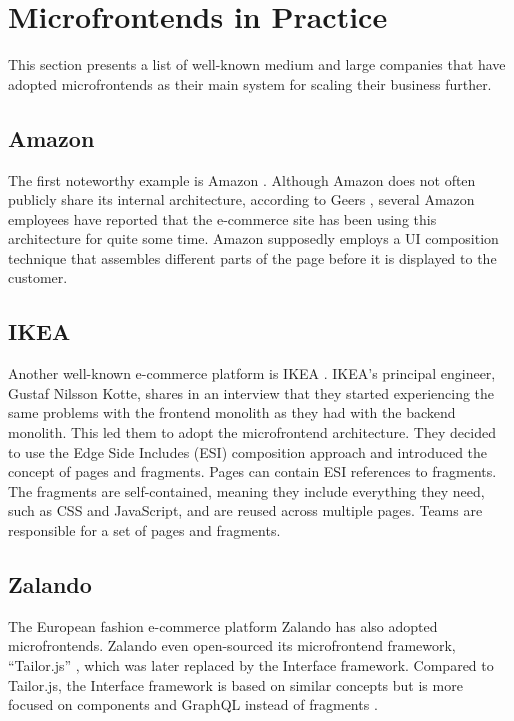 \section{Microfrontends in Practice}
This section presents a list of well-known medium and large companies that have adopted microfrontends as their main system for scaling their business further. \\

\subsection{Amazon}
The first noteworthy example is Amazon \cite{Amazon}. Although Amazon does not often publicly share its internal architecture, according to Geers \cite{Geers}, several Amazon employees have reported that the e-commerce site has been using this architecture for quite some time. Amazon supposedly employs a UI composition technique that assembles different parts of the page before it is displayed to the customer. \\

\subsection{IKEA}
Another well-known e-commerce platform is IKEA \cite{IKEA}. IKEA's principal engineer, Gustaf Nilsson Kotte, shares in an interview \cite{StenbergIkea} that they started experiencing the same problems with the frontend monolith as they had with the backend monolith. This led them to adopt the microfrontend architecture. They decided to use the Edge Side Includes (ESI) composition approach and introduced the concept of pages and fragments. Pages can contain ESI references to fragments. The fragments are self-contained, meaning they include everything they need, such as CSS and JavaScript, and are reused across multiple pages. Teams are responsible for a set of pages and fragments. \\

\subsection{Zalando}
The European fashion e-commerce platform Zalando \cite{Zalando} has also adopted microfrontends. Zalando even open-sourced its microfrontend framework, ``Tailor.js'' \cite{TailorJs}, which was later replaced by the Interface framework. Compared to Tailor.js, the Interface framework is based on similar concepts but is more focused on components and GraphQL instead of fragments \cite{MezzaliraBuildingMf}.\\

